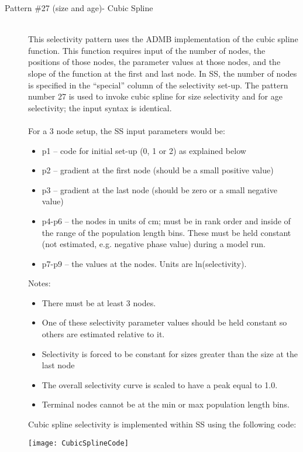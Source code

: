 \begin{description}
	\item[Pattern \#27 (size and age)- Cubic Spline]\hfil\\
	This selectivity pattern uses the ADMB implementation of the cubic spline function. This function requires input of the number of nodes, the positions of those nodes, the parameter values at those nodes, and the slope of the function at the first and last node.  In SS, the number of nodes is specified in the “special” column of the selectivity set-up.  The pattern number 27 is used to invoke cubic spline for size selectivity and for age selectivity; the input syntax is identical.\\
	\\
	For a 3 node setup, the SS input parameters would be:
	\begin{itemize}
		\item p1 – 	code for initial set-up (0, 1 or 2) as explained below
		\item p2 – 	gradient at the first node (should be a small positive value)
		\item p3 – 	gradient at the last node (should be zero or a small negative value)
		\item p4-p6 – the nodes in units of cm; must be in rank order and inside of the range of the population length bins.  These must be held constant (not estimated, e.g. negative phase value) during a model run.
		\item  p7-p9 – the values at the nodes.  Units are ln(selectivity).
	\end{itemize}
	Notes:
	\begin{itemize}
		\item There must be at least 3 nodes.
		\item One of these selectivity parameter values should be held constant so others are estimated relative to it.
		\item Selectivity is forced to be constant for sizes greater than the size at the last node
		\item The overall selectivity curve is scaled to have a peak equal to 1.0.
		\item Terminal nodes cannot be at the min or max population length bins.
	\end{itemize}
	
	Cubic spline selectivity is implemented within SS using the following code:\\
	\begin{center}
		\texttt{[image: CubicSplineCode]}
	\end{center}
	

\end{description}
